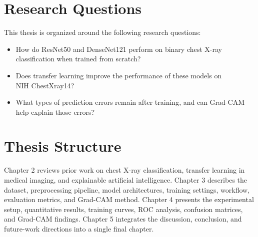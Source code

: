 \section{Research Questions}
This thesis is organized around the following research questions:
\begin{itemize}
    \item How do ResNet50 and DenseNet121 perform on binary chest X-ray classification when trained from scratch?
    \item Does transfer learning improve the performance of these models on\\
    NIH ChestXray14?
    \item What types of prediction errors remain after training, and can Grad-CAM help explain those errors?
\end{itemize}

\section{Thesis Structure}
Chapter 2 reviews prior work on chest X-ray classification, transfer learning in medical imaging, and explainable artificial intelligence. Chapter 3 describes the dataset, preprocessing pipeline, model architectures, training settings, workflow, evaluation metrics, and Grad-CAM method. Chapter 4 presents the experimental setup, quantitative results, training curves, ROC analysis, confusion matrices, and Grad-CAM findings. Chapter 5 integrates the discussion, conclusion, and future-work directions into a single final chapter.
